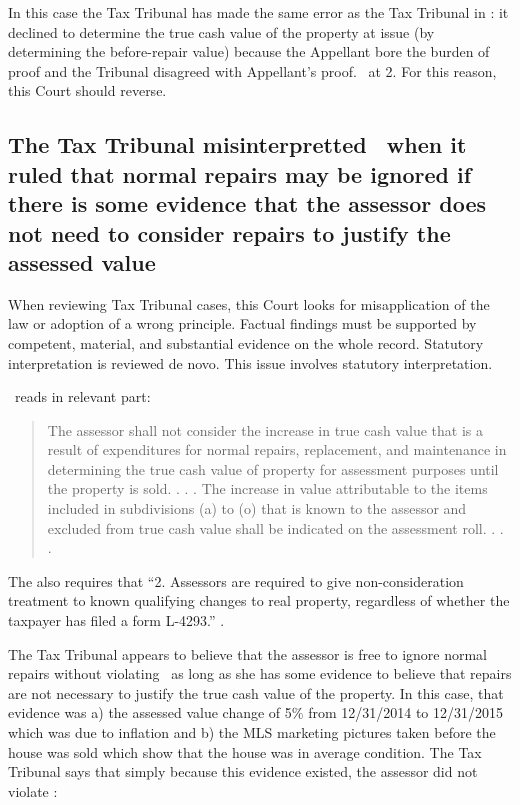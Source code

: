 \documentclass[12pt,\documentclassflag]{michiganCourtOfAppealsBrief}
\begin{document}
In this case the Tax Tribunal has made the same error as the Tax Tribunal in \cite[s]{Jones & Laughlin}: it declined to determine the true cash value of the property at issue (by determining the before-repair value) because the Appellant bore the burden of proof and the Tribunal disagreed with Appellant's proof. \orderDenying\ at 2. For this reason, this Court should reverse.

\subsection{The Tax Tribunal misinterpretted \mathieuGast\ when it ruled that normal repairs may be ignored if there is some evidence that the assessor does not need to consider repairs to justify the assessed value}

When reviewing Tax Tribunal cases, this Court looks for misapplication of the law or adoption of a wrong principle. Factual findings must be supported by competent, material, and substantial evidence on the whole record. Statutory interpretation is reviewed de novo.  This issue involves statutory interpretation.

\mathieuGast\ reads in relevant part:

\begin{quote}
	The assessor shall not consider the increase in true cash value that is a result of expenditures for normal repairs, replacement, and maintenance in determining the true cash value of property for assessment purposes until the property is sold. . . . The increase in value attributable to the items included in subdivisions (a) to (o) that is known to the assessor and excluded from true cash value shall be indicated on the assessment roll. . . .
\end{quote}

The \STC also requires that ``2. Assessors are required to give non-consideration treatment to known qualifying changes to real property, regardless of whether the taxpayer has filed a form L-4293.'' .

The Tax Tribunal appears to believe that the assessor is free to ignore normal repairs without violating \mathieuGast\ as long as she has some evidence to believe that repairs are not necessary to justify the true cash value of the property. In this case, that evidence was a) the assessed value change of 5\% from 12/31/2014 to 12/31/2015 which was due to inflation and b) the MLS marketing pictures taken before the house was sold which show that the house was in average condition. The Tax Tribunal says that simply because this evidence existed, the assessor did not violate \mathieuGast: 
\end{document}
